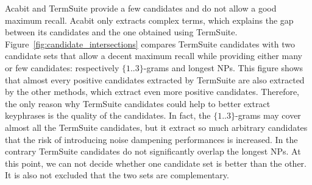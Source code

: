       Acabit and TermSuite provide a few candidates and do not allow a good
      maximum recall. Acabit only extracts complex terms, which explains the gap
      between its candidates and the one obtained using TermSuite.
      Figure~\ref{fig:candidate_intersections} compares TermSuite candidates
      with two candidate sets that allow a decent maximum recall while providing
      either many or few candidates: respectively $\{1..3\}$-grams and longest
      NPs. This figure shows that almost every positive candidates extracted by
      TermSuite are also extracted by the other methods, which extract even
      more positive candidates. Therefore, the only reason why TermSuite
      candidates could help to better extract keyphrases is the quality of the
      candidates. In fact, the $\{1..3\}$-grams may cover almost all the
      TermSuite candidates, but it extract so much arbitrary candidates that the
      risk of introducing noise dampening performances is increased. In the
      contrary TermSuite candidates do not significantly overlap the longest
      NPs. At this point, we can not decide whether one candidate set is better
      than the other. It is also not excluded that the two sets are
      complementary.

